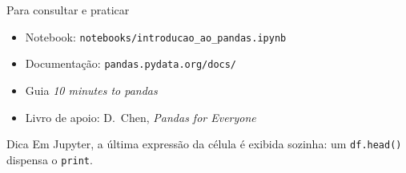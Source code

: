 \documentclass[aspectratio=169,10pt,t]{beamer}
\begin{document}
\begin{frame}{Para consultar e praticar}
  \begin{itemize}
    \item Notebook: \texttt{notebooks/introducao\_ao\_pandas.ipynb}
    \item Documentação: \texttt{pandas.pydata.org/docs/}
    \item Guia \emph{10 minutes to pandas}
    \item Livro de apoio: D.~Chen, \emph{Pandas for Everyone}
  \end{itemize}
  \begin{alertblock}{Dica}
    Em Jupyter, a última expressão da célula é exibida sozinha: um \texttt{df.head()} dispensa o \texttt{print}.
  \end{alertblock}
\end{frame}

\end{document}
